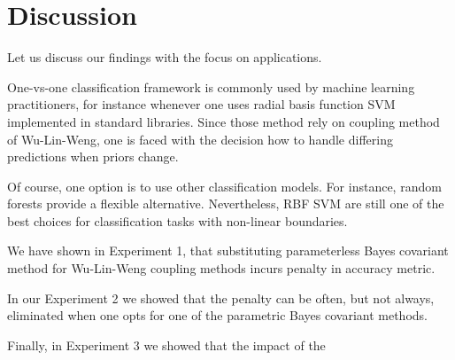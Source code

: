\section{Discussion}

Let us discuss our findings with the focus on applications.

One-vs-one classification framework is commonly used by machine learning practitioners, for instance whenever one uses radial basis function SVM implemented in  standard libraries. Since those method rely on coupling method of Wu-Lin-Weng, one is faced with the decision how to handle differing predictions when priors change.

Of course, one option is to use other classification models. For instance, random forests provide a flexible alternative. Nevertheless, RBF SVM are still one of the best choices for classification tasks with non-linear boundaries. 

We have shown in Experiment 1, that substituting parameterless Bayes covariant method for Wu-Lin-Weng coupling methods incurs penalty in accuracy metric. 

In our Experiment 2 we showed that the penalty can be often, but not always, eliminated when one opts for one of the parametric Bayes covariant methods.

Finally, in Experiment 3 we showed that the impact of the 

